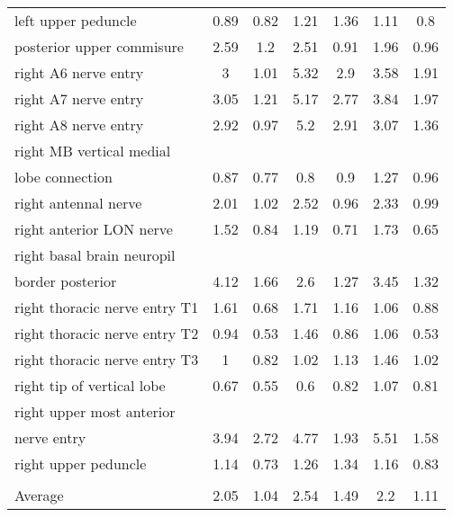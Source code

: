 \begin{tabular}{lcccccc}
 left upper peduncle                         & 0.89      & 0.82 & 1.21    & 1.36 & 1.11     & 0.8  \\
 posterior upper commisure                   & 2.59      & 1.2  & 2.51    & 0.91 & 1.96     & 0.96 \\
 right A6 nerve entry                        & 3         & 1.01 & 5.32    & 2.9  & 3.58     & 1.91 \\
 right A7 nerve entry                        & 3.05      & 1.21 & 5.17    & 2.77 & 3.84     & 1.97 \\
 right A8 nerve entry                        & 2.92      & 0.97 & 5.2     & 2.91 & 3.07     & 1.36 \\
 right MB vertical medial\\ lobe connection    & 0.87      & 0.77 & 0.8     & 0.9  & 1.27     & 0.96 \\
 right antennal nerve                        & 2.01      & 1.02 & 2.52    & 0.96 & 2.33     & 0.99 \\
 right anterior LON nerve                    & 1.52      & 0.84 & 1.19    & 0.71 & 1.73     & 0.65 \\
 right basal brain neuropil\\ border posterior & 4.12      & 1.66 & 2.6     & 1.27 & 3.45     & 1.32 \\
 right thoracic nerve entry T1               & 1.61      & 0.68 & 1.71    & 1.16 & 1.06     & 0.88 \\
 right thoracic nerve entry T2               & 0.94      & 0.53 & 1.46    & 0.86 & 1.06     & 0.53 \\
 right thoracic nerve entry T3               & 1         & 0.82 & 1.02    & 1.13 & 1.46     & 1.02 \\
 right tip of vertical lobe                  & 0.67      & 0.55 & 0.6     & 0.82 & 1.07     & 0.81 \\
 right upper most anterior\\ nerve entry       & 3.94      & 2.72 & 4.77    & 1.93 & 5.51     & 1.58 \\
 right upper peduncle                        & 1.14      & 0.73 & 1.26    & 1.34 & 1.16     & 0.83 \\
                                             &           &      &         &      &          &      \\\hline\hline
 Average                                     & 2.05      & 1.04 & 2.54    & 1.49 & 2.2      & 1.11 \\
\hline
\end{tabular}